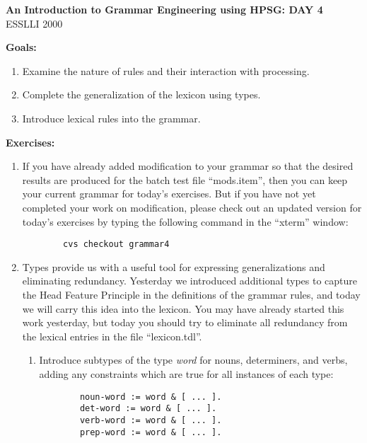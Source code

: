\documentclass[10pt]{article}
\begin{document}
\begin{center}
\textbf{An Introduction to Grammar Engineering using HPSG: DAY 4}\\
ESSLLI 2000
\end{center}

\medskip
\textbf{Goals:}
\begin{enumerate}
\item Examine the nature of rules and their interaction with processing.
\item Complete the generalization of the lexicon using types.
\item Introduce lexical rules into the grammar.
\end{enumerate}

\smallskip
\textbf{Exercises:}
\begin{enumerate}
\item If you have already added modification to your grammar so that the
desired results are produced for the batch test file ``mods.item'', then
you can keep your current grammar for today's exercises.  But if you have
not yet completed your work on modification, please check out an updated
version for today's exercises by typing the following command in the ``xterm''
window:
\begin{verbatim}
		cvs checkout grammar4
\end{verbatim}

\item Types provide us with a useful tool for expressing generalizations
and eliminating redundancy.  Yesterday we introduced additional types to 
capture the Head Feature Principle in the definitions of the grammar rules,
and today we will carry this idea into the lexicon.  You may have already 
started this work yesterday, but today you should try to eliminate all 
redundancy from the lexical entries in the file ``lexicon.tdl''.  
\begin{enumerate}
\item Introduce subtypes of the type {\it word} for nouns, determiners, 
and verbs, adding any constraints which are true for all instances of each
type:
\begin{verbatim}
		noun-word := word & [ ... ].
		det-word := word & [ ... ].
		verb-word := word & [ ... ].
		prep-word := word & [ ... ].
\end{verbatim}


\end{enumerate}
\end{enumerate}
\end{document}
